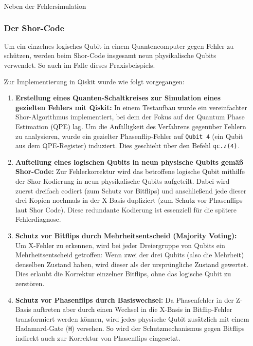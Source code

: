 Neben der Fehlersimulation 

\subsubsection{Der Shor-Code}
Um ein einzelnes logisches Qubit in einem Quantencomputer gegen Fehler zu schützen, werden beim Shor-Code insgesamt neun physikalische Qubits verwendet. So auch im Falle dieses Praxisbeispiels.

Zur Implementierung in Qiskit wurde wie folgt vorgegangen:
\begin{enumerate}
  \item \textbf{Erstellung eines Quanten-Schaltkreises zur Simulation eines gezielten Fehlers mit Qiskit:}  
  In einem Testaufbau wurde ein vereinfachter Shor-Algorithmus implementiert, bei dem der Fokus auf der Quantum Phase Estimation (QPE) lag. Um die Anfälligkeit des Verfahrens gegenüber Fehlern zu analysieren, wurde ein gezielter Phasenflip-Fehler auf \texttt{Qubit 4} (ein Qubit aus dem QPE-Register) induziert. Dies geschieht über den Befehl \texttt{qc.z(4)}.
\\
  \item \textbf{Aufteilung eines logischen Qubits in neun physische Qubits gemäß Shor-Code:}  
  Zur Fehlerkorrektur wird das betroffene logische Qubit mithilfe der Shor-Kodierung in neun physikalische Qubits aufgeteilt. Dabei wird zuerst dreifach codiert (zum Schutz vor Bitflips) und anschließend jede dieser drei Kopien nochmals in der X-Basis dupliziert (zum Schutz vor Phasenflips laut Shor Code). Diese redundante Kodierung ist essenziell für die spätere Fehlerdiagnose.
\\
  \item \textbf{Schutz vor Bitflips durch Mehrheitsentscheid (Majority Voting):}  
  Um X-Fehler zu erkennen, wird bei jeder Dreiergruppe von Qubits ein Mehrheitsentscheid getroffen: Wenn zwei der drei Qubits (also die Mehrheit) denselben Zustand haben, wird dieser als der ursprüngliche Zustand gewertet. Dies erlaubt die Korrektur einzelner Bitflips, ohne das logische Qubit zu zerstören.
\\
  \item \textbf{Schutz vor Phasenflips durch Basiswechsel:}  
  Da Phasenfehler in der Z-Basis auftreten aber durch einen Wechsel in die X-Basis in Bitflip-Fehler transformiert werden können, wird jedes physische Qubit zusätzlich mit einem Hadamard-Gate (\texttt{H}) versehen. So wird der Schutzmechanismus gegen Bitflips indirekt auch zur Korrektur von Phasenflips eingesetzt.

\end{enumerate}
